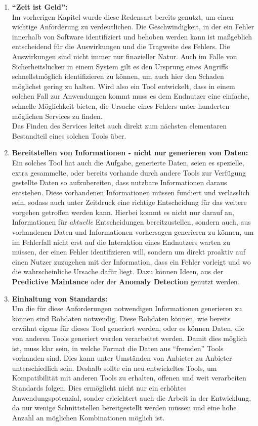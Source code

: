 \documentclass[
	12pt,
	BCOR=5mm,
	DIV=12,
	headinclude=on,
	footinclude=off,
	parskip=half,
	bibliography=totoc,
	listof=entryprefix,
	toc=listof,
	numbers=noenddot,
	plainfootsepline
]{scrreprt}
\begin{document}
\begin{enumerate}

\item \textbf{\enquote{Zeit ist Geld}:}\\
Im vorherigen Kapitel wurde diese Redensart bereits genutzt, um einen wichtige Anforderung zu verdeutlichen. Die Geschwindigkeit, in der ein Fehler innerhalb von Software identifiziert und behoben werden kann ist maßgeblich entscheidend für die Auswirkungen und die Tragweite des Fehlers. Die Auswirkungen sind nicht immer nur finazieller Natur. Auch im Falle von Sicherheitslücken in einem System gilt es den Ursprung eines Angriffs schnellstmöglich identifizieren zu können, um auch hier den Schaden möglichst gering zu halten. Wird also ein Tool entwickelt, dass in einem solchen Fall zur Anwendungen kommt muss es dem Endnutzer eine einfache, schnelle Möglichkeit bieten, die Ursache eines Fehlers unter hunderten möglichen Services zu finden. \\
Das Finden des Services leitet auch direkt zum nächsten elementaren Bestandteil eines solchen Tools über.

\item \textbf{Bereitstellen von Informationen - nicht nur generieren von Daten:}\\
Ein solches Tool hat auch die Aufgabe, generierte Daten, seien es spezielle, extra gesammelte, oder bereits vorhande durch andere Tools zur Verfügung gestellte Daten so aufzubereiten, dass nutzbare Informationen daraus entstehen. Diese vorhandenen Informationen müssen fundiert und verlässlich sein, sodass auch unter Zeitdruck eine richtige Entscheidung für das weitere vorgehen getroffen werden kann. Hierbei kommt es nicht nur darauf an, Informationen für \textit{aktuelle} Entscheidungen bereitzustellen, sondern auch, aus vorhandenen Daten und Informationen vorhersagen generieren zu können, um im Fehlerfall nicht erst auf die Interaktion eines Endnutzers warten zu müssen, der einen Fehler identifizieren will, sondern um direkt proaktiv auf einen Nutzer zuzugehen mit der Information, dass ein Fehler vorleigt und wo die wahrscheinliche Ursache dafür liegt. Dazu können Ideen, aus der \textbf{Predictive Maintance} oder der \textbf{Anomaly Detection} genutzt werden.

\item \textbf{Einhaltung von Standards:}\\
Um die für diese Anforderungen notwendigen Informationen generieren zu können sind Rohdaten notwendig. Diese Rohdaten können, wie bereits erwähnt eigens für dieses Tool generiert werden, oder es können Daten, die von anderen Tools generiert werden verarbeitet werden. Damit dies möglich ist, muss klar sein, in welche Format die Daten aus \enquote{fremden} Tools vorhanden sind. Dies kann unter Umständen von Anbieter zu Anbieter unterschiedlich sein. Deshalb sollte ein neu entwickeltes Tools, um Kompatibilität mit anderen Tools zu erhalten, offenen und weit verarbeiten Standards folgen. Dies ermöglicht nicht nur ein erhöhtes Anwendungspotenzial, sonder erleichtert auch die Arbeit in der Entwicklung, da nur wenige Schnittstellen bereitgestellt werden müssen und eine hohe Anzahl an möglichen Kombinationen möglich ist.


\end{enumerate}
\end{document}
